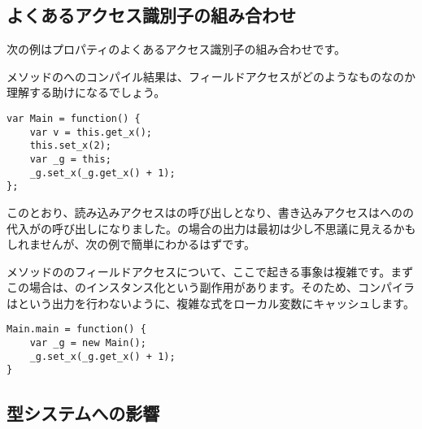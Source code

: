 
\subsection{よくあるアクセス識別子の組み合わせ}
\label{class-field-property-common-combinations}

次の例はプロパティのよくあるアクセス識別子の組み合わせです。


メソッドのへのコンパイル結果は、フィールドアクセスがどのようなものなのか理解する助けになるでしょう。

\begin{lstlisting}
var Main = function() {
	var v = this.get_x();
	this.set_x(2);
	var _g = this;
	_g.set_x(_g.get_x() + 1);
};
\end{lstlisting}

このとおり、読み込みアクセスはの呼び出しとなり、書き込みアクセスはへのの代入がの呼び出しになりました。\expr{+=}の場合の出力は最初は少し不思議に見えるかもしれませんが、次の例で簡単にわかるはずです。


メソッドののフィールドアクセスについて、ここで起きる事象は複雑です。まずこの場合は、のインスタンス化という副作用があります。そのため、コンパイラはという出力を行わないように、複雑な式をローカル変数にキャッシュします。

\begin{lstlisting}
Main.main = function() {
	var _g = new Main();
	_g.set_x(_g.get_x() + 1);
}
\end{lstlisting}

\subsection{型システムへの影響}
\label{class-field-property-type-system-impact}

